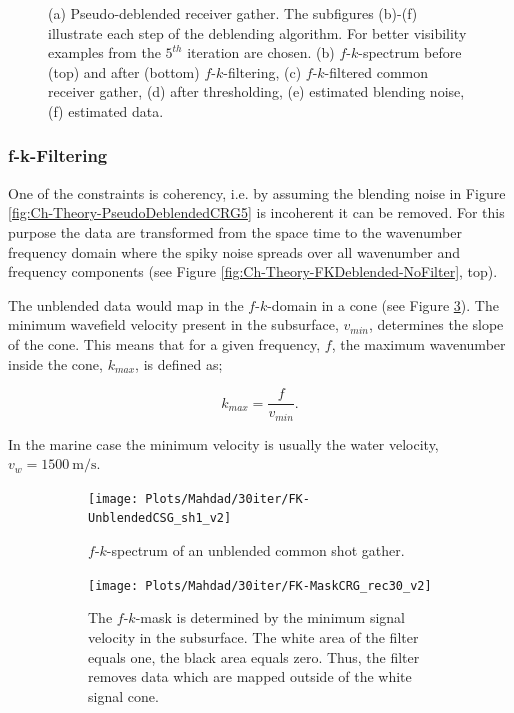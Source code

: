 \begin{figure}
\begin{subfigure}[t]{0.25\textwidth}
		\caption{}
		\label{fig:Ch-Theory-Deblended}
	\end{subfigure}
	\caption{(a) Pseudo-deblended receiver gather. The subfigures (b)-(f) illustrate each step of the deblending algorithm. For better visibility examples from the $5^{th}$ iteration are chosen. (b) $f$-$k$-spectrum before (top) and after (bottom) $f$-$k$-filtering, (c) $f$-$k$-filtered common receiver gather, (d) after thresholding, (e) estimated blending noise, (f) estimated data.}
	\label{fig:Ch-Theory-IterativeDeblending}
\end{figure}


\subsubsection*{f-k-Filtering}

One of the constraints is coherency, i.e. by assuming the blending noise in Figure \ref{fig:Ch-Theory-PseudoDeblendedCRG5} is incoherent it can be removed. For this purpose the data are transformed from the space time to the wavenumber frequency domain where the spiky noise spreads over all wavenumber and frequency components (see Figure \ref{fig:Ch-Theory-FKDeblended-NoFilter}, top). 


The unblended data would map in the $f$-$k$-domain in a cone (see Figure \ref{fig:Ch-Theory-fk-Unblended-data}). The minimum wavefield velocity present in the subsurface, $v_{min}$, determines the slope of the cone. This means that for a given frequency, $f$, the maximum wavenumber inside the cone, $k_{max}$, is defined as; 

\begin{equation}
	k_{max} = \frac{f}{v_{min}}.
	\label{eq_Ch-Theory-MaxWavenmber}
\end{equation} 

In the marine case the minimum velocity is usually the water velocity, $v_{w} = \SI{1500}{\metre\per\second}$.

\begin{figure}
	\centering
	\begin{subfigure}[t]{0.45\textwidth}
		\centering
		\texttt{[image: Plots/Mahdad/30iter/FK-UnblendedCSG\_sh1\_v2]}
		\caption{$f$-$k$-spectrum of an unblended common shot gather.}
		\label{fig:Ch-Theory-fk-Unblended-data}
	\end{subfigure}
	\centering
	\begin{subfigure}[t]{0.45\textwidth}
		\centering
		\texttt{[image: Plots/Mahdad/30iter/FK-MaskCRG\_rec30\_v2]}
		\caption{The $f$-$k$-mask is determined by the minimum signal velocity in the subsurface. The white area of the filter equals one, the black area equals zero. Thus, the filter removes data which are mapped outside of the white signal cone.}
		\label{fig:Ch-Theory-FK-Mask}
	\end{subfigure}
	
	\caption{}
	\label{fig:Ch-Theory-fk-unblended-data-mask}
\end{figure}

